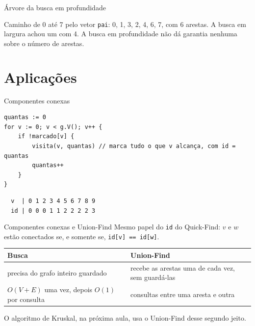 \documentclass{beamer}
\begin{document}
\begin{frame}{Árvore da busca em profundidade}
	\begin{center}
		\scalebox{0.9}{\grafoGdfs}
	\end{center}

	Caminho de 0 até 7 pelo vetor \texttt{pai}: 0, 1, 3, 2, 4, 6, 7, com 6
	arestas. A busca em largura achou um com 4. A busca em profundidade não dá
	garantia nenhuma sobre o número de arestas.
\end{frame}

\section{Aplicações}

\begin{frame}[fragile]{Componentes conexas}
	\begin{verbatim}
quantas := 0
for v := 0; v < g.V(); v++ {
	if !marcado[v] {
		visita(v, quantas) // marca tudo o que v alcança, com id = quantas
		quantas++
	}
}
\end{verbatim}

	\begin{center}
		\scalebox{0.8}{\grafoComp}
	\end{center}

	\begin{verbatim}
  v  | 0 1 2 3 4 5 6 7 8 9
  id | 0 0 0 1 1 2 2 2 2 3
\end{verbatim}
\end{frame}

\begin{frame}{Componentes conexas e Union-Find}
	Mesmo papel do \texttt{id} do Quick-Find: $v$ e $w$ estão conectados se, e
	somente se, \texttt{id[v] == id[w]}.

	\vspace{0.3cm}
	\begin{tabular}{p{4.8cm}p{4.8cm}}
		\toprule
		Busca & Union-Find \\
		\midrule
		precisa do grafo inteiro guardado & recebe as arestas uma de cada vez,
		sem guardá-las \\
		$O(V + E)$ uma vez, depois $O(1)$ por consulta & consultas entre uma
		aresta e outra \\
		\bottomrule
	\end{tabular}

	\vspace{0.3cm}
	O algoritmo de Kruskal, na próxima aula, usa o Union-Find desse segundo jeito.
\end{frame}
\end{document}
